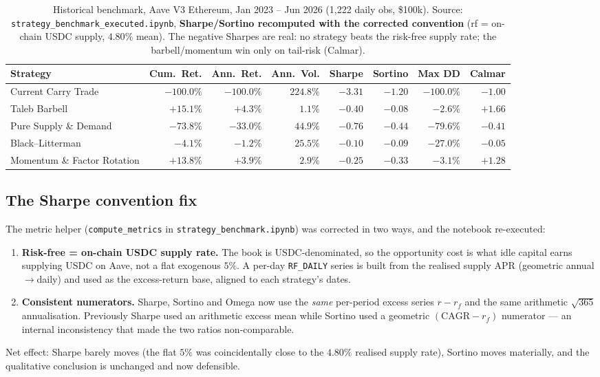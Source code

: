 \documentclass[11pt]{article}
\newcommand{\code}[1]{\texttt{\small #1}}
\begin{document}
\begin{table}[htbp]
\centering
\caption{Historical benchmark, Aave V3 Ethereum, Jan 2023 -- Jun 2026
(1{,}222 daily obs, \$100k). Source: \code{strategy\_benchmark\_executed.ipynb},
\textbf{Sharpe/Sortino recomputed with the corrected convention}
(rf = on-chain USDC supply, $4.80\%$ mean). The negative Sharpes are real: no
strategy beats the risk-free supply rate; the barbell/momentum win only on
tail-risk (Calmar).}
\label{tab:benchmark}
\small
\begin{tabular}{lrrrrrrr}
\toprule
Strategy & Cum.\ Ret. & Ann.\ Ret. & Ann.\ Vol. & Sharpe & Sortino & Max DD & Calmar \\
\midrule
\rowcolor{red!10} Current Carry Trade & $-100.0\%$ & $-100.0\%$ & $224.8\%$ & $-3.31$ & $-1.20$ & $-100.0\%$ & $-1.00$ \\
\rowcolor{green!10} Taleb Barbell      & $+15.1\%$  & $+4.3\%$   & $1.1\%$   & $-0.40$ & $-0.08$ & $-2.6\%$   & $+1.66$ \\
Pure Supply \& Demand                  & $-73.8\%$  & $-33.0\%$  & $44.9\%$  & $-0.76$ & $-0.44$ & $-79.6\%$  & $-0.41$ \\
Black--Litterman                       & $-4.1\%$   & $-1.2\%$   & $25.5\%$  & $-0.10$ & $-0.09$ & $-27.0\%$  & $-0.05$ \\
Momentum \& Factor Rotation            & $+13.8\%$  & $+3.9\%$   & $2.9\%$   & $-0.25$ & $-0.33$ & $-3.1\%$   & $+1.28$ \\
\bottomrule
\end{tabular}
\end{table}

\subsection*{The Sharpe convention fix}\label{sec:sharpefix}
The metric helper (\code{compute\_metrics} in \code{strategy\_benchmark.ipynb})
was corrected in two ways, and the notebook re-executed:
\begin{enumerate}
  \item \textbf{Risk-free = on-chain USDC supply rate.} The book is
  USDC-denominated, so the opportunity cost is what idle capital earns supplying
  USDC on Aave, not a flat exogenous $5\%$. A per-day \code{RF\_DAILY} series is
  built from the realised supply APR (geometric annual$\to$daily) and used as the
  excess-return base, aligned to each strategy's dates.
  \item \textbf{Consistent numerators.} Sharpe, Sortino and Omega now use the
  \emph{same} per-period excess series $r-r_f$ and the same arithmetic
  $\sqrt{365}$ annualisation. Previously Sharpe used an arithmetic excess mean
  while Sortino used a geometric $(\text{CAGR}-r_f)$ numerator --- an internal
  inconsistency that made the two ratios non-comparable.
\end{enumerate}
Net effect: Sharpe barely moves (the flat $5\%$ was coincidentally close to the
$4.80\%$ realised supply rate), Sortino moves materially, and the qualitative
conclusion is unchanged and now defensible.
\end{document}
